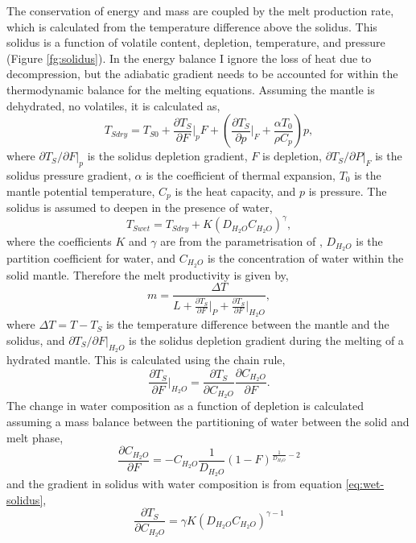 The conservation of energy and mass are coupled by the melt production rate, which is calculated from the temperature difference above the solidus. This solidus is a function of volatile content, depletion, temperature, and pressure (Figure \ref{fg:solidus}). In the energy balance I ignore the loss of heat due to decompression, but the adiabatic gradient needs to be accounted for within the thermodynamic balance for the melting equations. Assuming the mantle is dehydrated, no volatiles, it is calculated as,
\begin{equation}
T_{Sdry} = T_{S0} + \frac{\partial T_{S}}{\partial F}\vert_{p}F + \left(\frac{\partial T_{S}}{\partial p}\vert_{F} + \frac{\alpha T_{0}}{\rho C_{p}}\right)p,
\label{eq:dry-solidus}
\end{equation}
where $\partial T_{S}/\partial F\vert_{p}$ is the solidus depletion gradient, $F$ is depletion, $\partial T_{S}/\partial P\vert_{F}$ is the solidus pressure gradient, $\alpha$ is the coefficient of thermal expansion, $T_{0}$ is the mantle potential temperature, $C_{p}$ is the heat capacity, and $p$ is pressure. The solidus is assumed to deepen in the presence of water,
\begin{equation}
T_{Swet} = T_{Sdry} + K\left(D_{H_{2}O}C_{H_{2}O}\right)^{\gamma},
\label{eq:wet-solidus}
\end{equation}
where the coefficients $K$ and $\gamma$ are from the parametrisation of \cite{katz-etal-2003}, $D_{H_{2}O}$ is the partition coefficient for water, and $C_{H_{2}O}$ is the concentration of water within the solid mantle. Therefore the melt productivity is given by,
\begin{equation}
m = \frac{\Delta T}{L + \frac{\partial T_{S}}{\partial F}\vert_{P} + \frac{\partial T_{S}}{\partial F}\vert_{H_{2}O}},
\label{eq:melt-productivity}
\end{equation}
where $\Delta T = T-T_{S}$ is the temperature difference between the mantle and the solidus, and $\partial T_{S}/\partial F\vert_{H_{2}O}$ is the solidus depletion gradient during the melting of a hydrated mantle. This is calculated using the chain rule,
\begin{equation}
\frac{\partial T_{S}}{\partial F}\vert_{H_{2}O} = \frac{\partial T_{S}}{\partial C_{H_{2}O}} \frac{\partial C_{H_{2}O}}{\partial F}.
\end{equation}
The change in water composition as a function of depletion is calculated  assuming a mass balance between the partitioning of water between the solid and melt phase,
\begin{equation}
\frac{\partial C_{H_{2}O}}{\partial F} = -C_{H_{2}O} \frac{1}{D_{H_{2}O}}\left(1-F\right)^{\frac{1}{D_{H_{2}O}}-2}
\end{equation}
and the gradient in solidus with water composition is from equation \ref{eq:wet-solidus},
\begin{equation}
\frac{\partial T_{S}}{\partial C_{H_{2}O}} = \gamma K\left(D_{H_{2}O}C_{H_{2}O}\right)^{\gamma-1}
\end{equation}

